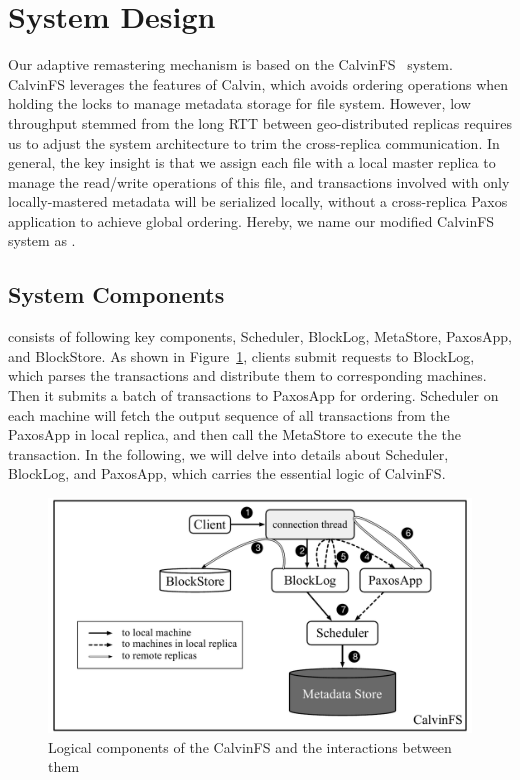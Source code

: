 \section{System Design}

Our adaptive remastering mechanism is based on the CalvinFS~\cite{thomson2015calvinfs} system. CalvinFS leverages the features of Calvin, which avoids ordering operations when holding the locks to manage metadata storage for file system. However, low throughput stemmed from the long RTT between geo-distributed replicas requires us to adjust the system architecture to trim the cross-replica communication. In general, the key insight is that we assign each file with a local master replica to manage the read/write operations of this file, and transactions involved with only locally-mastered metadata will be serialized locally, without a cross-replica Paxos application to achieve global ordering. Hereby, we name our modified CalvinFS system as \name.

\subsection{System Components}
\name{} consists of following key components, \textsf{Scheduler}, \textsf{BlockLog}, \textsf{MetaStore}, \textsf{PaxosApp}, and \textsf{BlockStore}. As shown in Figure~\ref{fig:arch}, clients submit requests to \textsf{BlockLog}, which parses the transactions and distribute them to corresponding machines. Then it submits a batch of transactions to \textsf{PaxosApp} for ordering. \textsf{Scheduler} on each machine will fetch the output sequence of all transactions from the \textsf{PaxosApp} in local replica, and then call the \textsf{MetaStore} to execute the the transaction. In the following, we will delve into details about \textsf{Scheduler}, \textsf{BlockLog}, and \textsf{PaxosApp}, which carries the essential logic of CalvinFS.

\begin{figure}[tp]
\centering
\includegraphics[width=1.8\columnwidth]{figures/arch}
\caption{Logical components of the CalvinFS and the interactions between them}
\label{fig:arch}
\end{figure}

